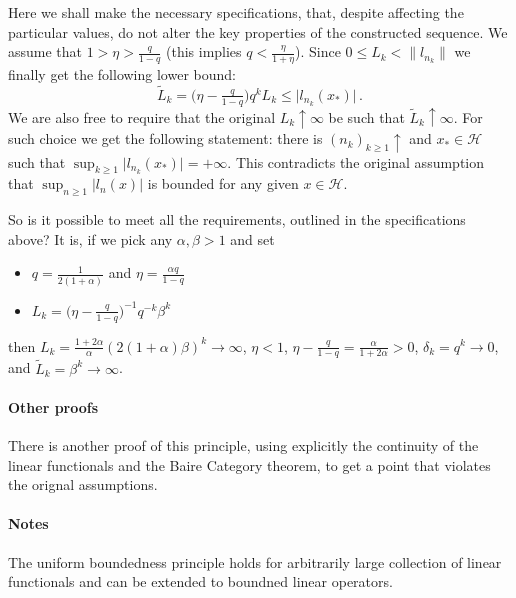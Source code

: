 \documentclass[a4paper]{article}
\newcommand{\Hcal}{\mathcal{H}}
\begin{document}
Here we shall make the necessary specifications, that, despite affecting the particular
values, do not alter the key properties of the constructed sequence. We assume that
$1 > \eta > \tfrac{q}{1-q}$ (this implies $q < \tfrac\eta{1 + \eta}$). Since $0 \leq
L_k < \|l_{n_k}\|$ we finally get the following lower bound:
\begin{equation*}
  \tilde{L}_k
    = \bigl(\eta - \tfrac{q}{1-q} \bigr) q^k L_k
    \leq \lvert l_{n_k}(x_*) \rvert
    \,.
\end{equation*}
We are also free to require that the original $L_k \uparrow \infty$ be such that
$\tilde{L}_k \uparrow \infty$. For such choice we get the following statement: there
is $(n_k)_{k\geq1} \uparrow$ and $x_* \in \Hcal$ such that $\sup_{k\geq 1} \lvert
l_{n_k}(x_*) \rvert = +\infty$. This contradicts the original assumption that
$\sup_{n\geq 1}\lvert l_n(x) \rvert$ is bounded for any given $x\in \Hcal$.

So is it possible to meet all the requirements, outlined in the specifications above?
It is, if we pick any $\alpha, \beta > 1$ and set
\begin{itemize}
  \item $q = \tfrac1{2 (1 + \alpha)}$ and $\eta = \tfrac{\alpha q}{1-q}$
  \item $L_k = \bigl(\eta - \tfrac{q}{1-q}\bigr)^{-1} q^{-k} \beta^k$
\end{itemize}
then $L_k = \tfrac{1 + 2\alpha}\alpha (2 (1 + \alpha) \beta)^k \to \infty$, $\eta < 1$,
$\eta - \tfrac{q}{1-q} = \tfrac\alpha{1 + 2\alpha} > 0$, $\delta_k = q^k \to 0$,
and $\tilde{L}_k = \beta^k \to \infty$.


\paragraph{Other proofs} %
\label{par:other_proofs}

There is another proof of this principle, using explicitly the continuity of the
linear functionals and the Baire Category theorem, to get a point that violates
the orignal assumptions.


\paragraph{Notes} %
\label{par:notes}

The uniform boundedness principle holds for arbitrarily large collection of linear
functionals and can be extended to boundned linear operators.


\end{document}
